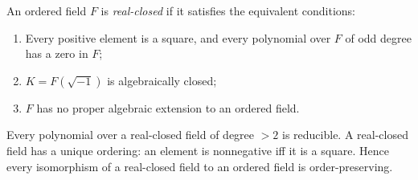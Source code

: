 An ordered field $F$ is \emph{real-closed} if it satisfies the equivalent conditions:
\begin{enumerate}
\item[(1)] Every positive element is a square, and every polynomial over $F$ of odd degree has a zero in $F$;
\item[(2)] $K = F(\sqrt{-1})$ is algebraically closed;
\item[(3)] $F$ has no proper algebraic extension to an ordered field.
\end{enumerate}
Every polynomial over a real-closed field of degree $>2$ is reducible. A real-closed field has a unique ordering: an element is nonnegative iff it is a square. Hence every isomorphism of a real-closed field to an ordered field is order-preserving.